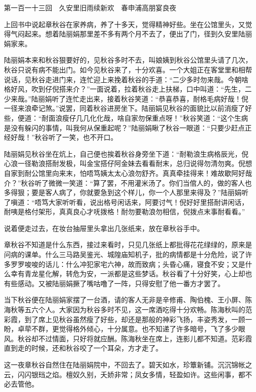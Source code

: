 \documentclass[12pt,UTF8]{ctexbook}
\begin{document}
{{{第一百一十三回　久安里旧雨续新欢　春申浦高朋宴良夜





上回书中说起章秋谷在家养病，养了十多天，觉得精神好些。坐在公馆里头，又觉得气闷起来。想着陆丽娟那里差不多有两个月不去了，便出了门，径到久安里陆丽娟家来。

陆丽娟本来和秋谷狠要好的，见秋谷多时不去，叫娘姨到秋谷公馆里头请了几次，秋谷只说有病不能出门。如今见秋谷来了，十分欢喜。一个大姐正在客堂里和相帮说话，见秋谷走进门来，连忙迎上来挽着秋谷的手道：“二少多时勿来哉。今朝啥格好风，吹到仔倪搭来介？”一面说着，拉着秋谷走上扶梯，口中叫道：“先生，二少来哉。”陆丽娟听了连忙走出来，接着秋谷笑道：“恭喜恭喜，耐格毛病好哉！倪一径来浪牵记煞。”说罢，同着秋谷进房坐下。陆丽娟见秋谷的面貌比以前消瘦了好些，便道：“耐面浪瘦仔几几化化哉，啥自家勿保重点呀！”秋谷笑道：“这个生病是没有躲闪的事情，叫我何从保重起呢？”陆丽娟瞅了秋谷一眼道：“只要少赶点正经好哉！”秋谷听了一笑，也不开口。

陆丽娟见秋谷坐在炕上，自己便也挨着秋谷身旁坐下道：“耐勒浪生病格辰光，倪心浪一径勒浪搭耐发极，叫金宝搭仔阿金妹去看看耐末，总归说得勿清勿爽。倪想自家到耐公馆里向来末，怕唔笃姨太太心浪勿舒齐。真真牵挂得来！难故歇阿好哉介？”秋谷听了微微一笑道：“算了罢，不用灌米汤了。你们当倌人的，做的客人也多得狠；要是客人病了，你就要急到这个样儿，你一个人那里来得及？”陆丽娟听了嗔道：“唔笃大家听听看，说出格号闲话来，阿要讨气！倪好好里搭耐讲闲话，耐咦是格付架形，真真良心才呒拨格！耐勿要勒浪勿相信，倪拨点末事耐看看。”

说着便走过去，在妆台抽屉里头拿出几张纸来，放在章秋谷手中。

章秋谷不知道是什么东西，接过来看时，只见几张纸上都批得花花绿绿的，原来是问病的课单。什么三马路吴鉴光、城隍庙知机子，批的病情都是十分危险，说了许多罗罗唆唆的话儿：什么冲犯家宅六神，故而致病；头昏心痛，寝食不安；又是什么幸有青龙星化解，转危为安，一派都是这些梦话。秋谷看了十分好笑，心上却也有些感动。又被陆丽娟撅了嘴咕噜了一阵，只得安慰了他一番方才罢了。

当下秋谷便在陆丽娟家摆了一台酒，请的客人无非是辛修甫、陶伯槐、王小屏、陈海秋等五六个人。大家因为秋谷多时不见，这一席酒吃得十分欢畅。陈海秋叫的范彩霞，到了席上见秋谷虽然瘦了好些，却还是那般的神彩飞扬，丰姿秀发，一顾一盼，卓荦不群，更觉得格外倾心，十分属意。也不知递了许多暗号，飞了多少眼风。秋谷却不过情面，只好将就应酬。陈海秋坐在席上，连影儿都不知道。范彩霞直到走的时候，还和秋谷咬了一个耳朵，方才走了。

这一夜章秋谷自然住在陆丽娟院中，不回去了。碧天如水，珍簟新铺。沉沉锦帐之云，闪闪银珰之焰。檀奴久别，夭娇非常；凤女多情，轻盈如许。这些闲事，都不必去管他。

}}}
\end{document}
